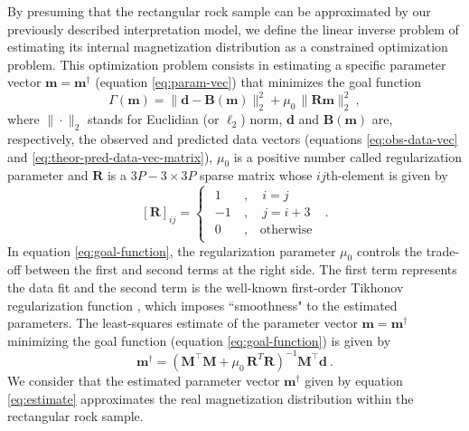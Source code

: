\documentclass[galley,gc]{agutex}
\begin{document}
\begin{article}
By presuming that the rectangular rock sample can
be approximated by our previously described 
interpretation model, we define the linear inverse
problem of estimating its internal magnetization
distribution as a constrained optimization problem.
This optimization problem consists in 
estimating a specific parameter vector 
$\mathbf{m} = \mathbf{m}^{\dagger}$ (equation \ref{eq:param-vec}) 
that minimizes the goal function
\begin{equation}
\Gamma(\mathbf{m}) =
\| \mathbf{d} - \mathbf{B}(\mathbf{m}) \|_{2}^{2} + 
\mu_0 \, \| \mathbf{R} \mathbf{m} \|_{2}^{2} \: ,
\label{eq:goal-function}
\end{equation}
where $\| \cdot \|_{2}$ stands for Euclidian (or $\ell_{2}$) norm, 
$\mathbf{d}$ and $\mathbf{B}(\mathbf{m})$ are,
respectively, the observed and predicted data vectors
(equations \ref{eq:obs-data-vec} and \ref{eq:theor-pred-data-vec-matrix}),
$\mu_0$ is a positive number called regularization parameter and
$\mathbf{R}$ is a $3P-3 \times 3P$ sparse matrix 
whose $ij$th-element is given by
\begin{equation}
\left[ \mathbf{R} \right]_{ij} = 
\begin{cases}
\begin{split}
1 &\: , \quad i = j \\
-1 &\: , \quad j = i+3 \\
0 &\: , \quad \text{otherwise}
\end{split}
\end{cases} \: .
\label{eq:elements_matrix}
\end{equation}
In equation \ref{eq:goal-function}, the regularization parameter $\mu_0$ 
controls the trade-off between 
the first and second terms at the right side. 
The first term represents the data fit
and the second term is the well-known first-order Tikhonov regularization 
function \citep{aster2005}, which imposes
``smoothness" to the estimated parameters.
The least-squares estimate of the parameter vector 
$\mathbf{m} = \mathbf{m}^{\dagger}$ minimizing 
the goal function (equation \ref{eq:goal-function}) is given by
\begin{equation}
\mathbf{m}^{\dagger} = \left( \mathbf{M}^{\top}\mathbf{M} + \mu_0 \,  
\mathbf{R}^T \mathbf{R}\right)^{-1}
\mathbf{M}^{\top}\mathbf{d} \: .
\label{eq:estimate}
\end{equation}
We consider that the estimated parameter vector $\mathbf{m}^{\dagger}$
given by equation \ref{eq:estimate} approximates the real magnetization 
distribution within the rectangular rock sample.


\end{article}
\end{document}
